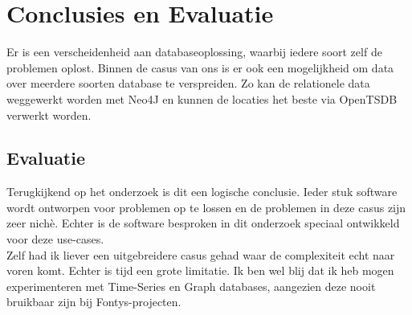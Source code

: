 \chapter{Conclusies en Evaluatie}

Er is een verscheidenheid aan databaseoplossing, waarbij iedere soort zelf de problemen oplost. Binnen de casus van ons is er ook een mogelijkheid om data over meerdere soorten database te verspreiden. Zo kan de relationele data weggewerkt worden met Neo4J en kunnen de locaties het beste via OpenTSDB verwerkt worden. \\

\section{Evaluatie}

Terugkijkend op het  onderzoek is dit een logische conclusie. Ieder stuk software wordt ontworpen voor problemen op te lossen en de problemen in deze casus zijn zeer nich\`e. Echter is de software besproken in dit onderzoek speciaal ontwikkeld voor deze use-cases. \\

Zelf had ik liever een uitgebreidere casus gehad waar de complexiteit echt naar voren komt. Echter is tijd een grote limitatie. Ik ben wel blij dat ik heb mogen experimenteren met Time-Series en Graph databases, aangezien deze nooit bruikbaar zijn bij Fontys-projecten.
